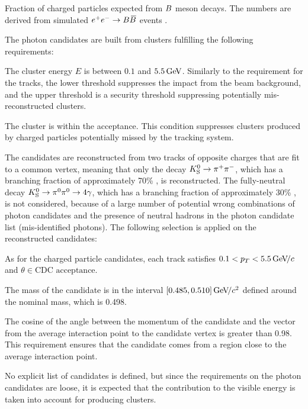 {Fraction of charged particles expected from $B$ meson decays.
The numbers are derived from simulated $e^+e^-\rightarrow B\kern 0.18em\overline{\kern -0.18em B}{}$ events \cite{Bertacchi2021}.}

The photon candidates are built from \ECL clusters fulfilling the following requirements:
\bi
\item The cluster energy $E$ is between $0.1$ and $5.5\mathrm{\,Ge\kern -0.1em V}$.
Similarly to the \pt requirement for the tracks, the lower threshold suppresses the impact from the beam background, and the upper threshold is a security threshold suppressing potentially mis-reconstructed \ECL clusters.
\item The cluster is within the \CDC acceptance.
This condition suppresses clusters produced by charged particles potentially missed by the tracking system.
\ei

The \KS candidates are reconstructed from two tracks of opposite charges that are fit to a common vertex, meaning that only the decay $K^0_{\mathrm{S}}\rightarrow\pi^+\pi^-$, which has a branching fraction of approximately 70\% \cite{ParticleDataGroup:2020ssz}, is reconstructed.
The fully-neutral decay $K^0_{\mathrm{S}}\rightarrow\pi^0\pi^0\rightarrow4\gamma$, which has a branching fraction of approximately 30\% \cite{ParticleDataGroup:2020ssz}, is not considered, because of a large number of potential wrong combinations of photon candidates and the presence of neutral hadrons in the photon candidate list (mis-identified photons).
The following selection is applied on the reconstructed \KS candidates:
\bi
\item As for the charged particle candidates, each track satisfies $0.1<p_T<5.5{\mathrm{\,Ge\kern -0.1em V\!/}c}$ and $\theta\in\text{CDC acceptance}$.
\item The mass of the \KS candidate is in the interval $[0.485,0.510]{\mathrm{\,Ge\kern -0.1em V\!/}c^2}$ defined around the nominal \KS mass, which is 0.498\gevcc \cite{ParticleDataGroup:2020ssz}.
\item The cosine of the angle between the momentum of the \KS candidate and the vector from the average interaction point to the \KS candidate vertex is greater than 0.98.
This requirement ensures that the \KS candidate comes from a region close to the average interaction point.
\ei

No explicit list of \KL candidates is defined, but since the requirements on the photon candidates are loose, it is expected that the \KL contribution to the visible energy is taken into account for \KL producing \ECL clusters.


